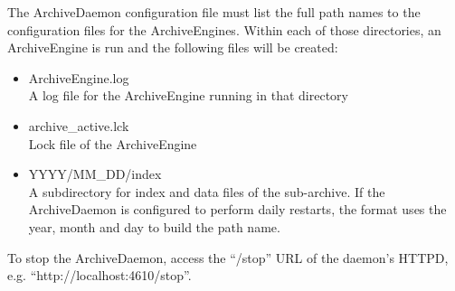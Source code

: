 \noindent The ArchiveDaemon configuration file must list the full path
names to the configuration files for the ArchiveEngines.
Within each of those directories, an ArchiveEngine is run and the
following files will be created:
\begin{itemize}
\item ArchiveEngine.log\\
  A log file for the ArchiveEngine running in that directory
\item archive\_active.lck\\
  Lock file of the ArchiveEngine
\item YYYY/MM\_DD/index \\
  A subdirectory for index and data files of the sub-archive.  If the
  ArchiveDaemon is configured to perform daily restarts, the format
  uses the year, month and day to build the path name.
\end{itemize}

\noindent To stop the ArchiveDaemon, access the ``/stop'' URL
of the daemon's HTTPD, e.g. ``http://localhost:4610/stop''.
